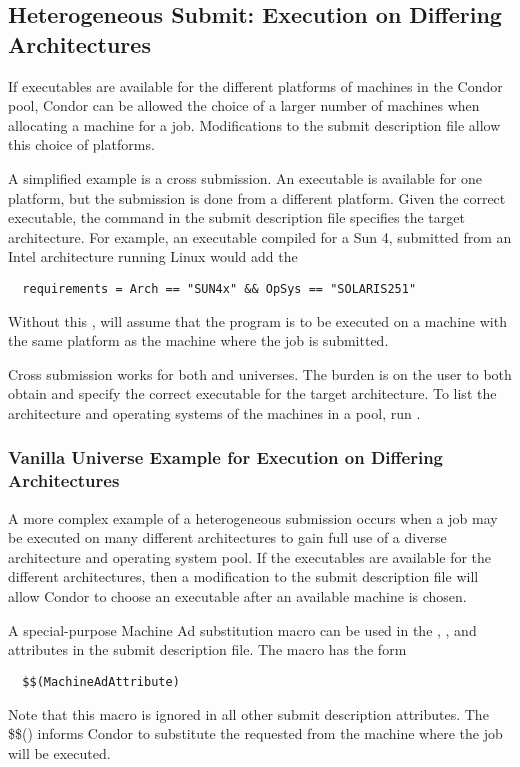 \subsection{Heterogeneous Submit: Execution on Differing Architectures} 

If executables are available for the different platforms of machines
in the Condor pool,
Condor can be allowed the choice of a larger number of machines
when allocating a machine for a job.
Modifications to the submit description file allow this choice
of platforms.

A simplified example is a cross submission.
An executable is available for one platform, but
the submission is done from a different platform.
Given the correct executable, the  command in
the submit description file specifies the target architecture.
For example, an executable compiled for a Sun 4, submitted
from an Intel architecture running Linux would add the 
\begin{verbatim}
  requirements = Arch == "SUN4x" && OpSys == "SOLARIS251"
\end{verbatim}
Without this , 
will assume that the program is to be executed on
a machine with the same platform as the machine where the job
is submitted.

Cross submission works for both
 and  universes.
The burden is on the user to both obtain and specify
the correct executable for the target architecture.
To list the architecture and operating systems of the machines
in a pool, run .

\subsubsection{Vanilla Universe Example for Execution on Differing Architectures} 

A more complex example of a heterogeneous submission
occurs when a job may be executed on
many different architectures to gain full
use of a diverse architecture and operating system pool.
If the executables are available for the different architectures,
then a modification to the submit description file
will allow Condor to choose an executable after an
available machine is chosen.

A special-purpose Machine Ad substitution macro can be used in
the , ,  and 
attributes in the submit description file.
The macro has the form
\begin{verbatim}
  $$(MachineAdAttribute)
\end{verbatim}
Note that this macro is ignored in all other submit description attributes.
The \$\$() informs Condor to substitute the requested 
from the machine where the job will be executed.

